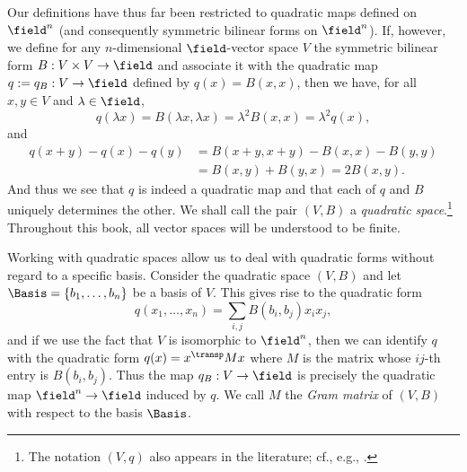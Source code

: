 Our definitions have thus far been restricted to quadratic maps defined on \(\field^n\) (and consequently symmetric bilinear forms on \(\field^n\)). If, however, we define for any \(n\)-dimensional \(\field\)-vector space \(V\) the symmetric bilinear form \(B: V \times V \to \field\) and associate it with the quadratic map \(q:= q_B: V \to \field\) defined by \(q(x) = B(x,x)\), then we have, for all \(x, y \in V\) and \(\lambda \in \field\),
\[
    q(\lambda x) = B(\lambda x, \lambda x) = \lambda^2 B(x, x) = \lambda^2 q(x),
\]
and
\begin{align*}
    q(x + y ) - q(x) - q(y) &= B(x+y, x+y) - B(x, x) - B(y, y)\\
    &=B(x,y) + B(y,x) = 2B(x,y).
\end{align*}
And thus we see that \(q\) is indeed a quadratic map and that each of \(q\) and \(B\) uniquely determines the other. We shall call the pair \((V, B)\) a \emph{quadratic space}.\footnote{The notation \((V, q)\) also appears in the literature; cf., e.g., \cite[p.~4]{lam1973quadratic}.} Throughout this book, all vector spaces will be understood to be finite.

Working with quadratic spaces allow us to deal with quadratic forms without regard to a specific basis. Consider the quadratic space \((V, B)\) and let \(\Basis = \{b_1, \dots, b_n\}\) be a basis of \(V\). This gives rise to the quadratic form
\[
  q(x_1, \dots, x_n) = \sum_{i, j} B(b_i, b_j) x_i x_j,  
\]
and if we use the fact that \(V\) is isomorphic to \(\field^n\), then we can identify \(q\) with the quadratic form \(q(x) = x^{\transp}Mx\) where \(M\) is the matrix whose \(ij\)-th entry is \(B(b_i, b_j)\). Thus the map \(q_B : V \to \field\) is precisely the quadratic map \(\field^n \to \field\) induced by \(q\). We call \(M\) the \emph{Gram matrix} of \((V, B)\) with respect to the basis \(\Basis\).\label{sec:quadratic-forms-basis}

